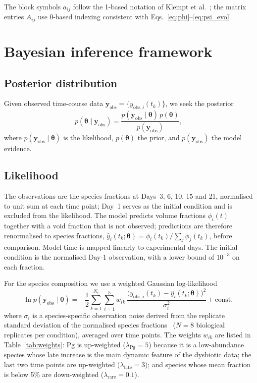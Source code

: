 \documentclass[11pt,a4paper]{article}
\newcommand{\btheta}{\boldsymbol{\theta}}
\newcommand{\yobs}{\mathbf{y}_{\mathrm{obs}}}
\begin{document}
The block symbols $a_{ij}$ follow the 1-based notation of Klempt et al.~\cite{Klempt2025ContinuumBiofilm}; the matrix entries $A_{ij}$ use 0-based indexing consistent with Eqs.~\eqref{eq:phi}--\eqref{eq:psi_evol}.

\section{Bayesian inference framework}
\label{sec:bayes}

\subsection{Posterior distribution}

Given observed time-course data $\yobs = \{y_{\mathrm{obs},i}(t_k)\}$, we seek the posterior
\begin{equation}
p(\btheta\mid\yobs)
= \frac{p(\yobs\mid\btheta)\,p(\btheta)}{p(\yobs)},
\label{eq:bayes}
\end{equation}
where $p(\yobs\mid\btheta)$ is the likelihood, $p(\btheta)$ the prior, and $p(\yobs)$ the model evidence.

\subsection{Likelihood}
\label{sec:likelihood}

The observations are the species fractions at Days~3, 6, 10, 15 and 21, normalised to unit sum at each time point; Day~1 serves as the initial condition and is excluded from the likelihood.
The model predicts volume fractions $\phi_i(t)$ together with a void fraction that is not observed; predictions are therefore renormalised to species fractions, $\hat{y}_i(t_k;\btheta)=\phi_i(t_k)\big/\sum_{j}\phi_j(t_k)$, before comparison.
Model time is mapped linearly to experimental days.
The initial condition is the normalised Day-1 observation, with a lower bound of $10^{-3}$ on each fraction.

For the species composition we use a weighted Gaussian log-likelihood
\begin{equation}
\ln p(\yobs\mid\btheta)
= -\frac12\sum_{k=1}^{N_t}\sum_{i=1}^{5} w_{ik}\,
\frac{\bigl(y_{\mathrm{obs},i}(t_k)-\hat{y}_i(t_k;\btheta)\bigr)^2}{\sigma_i^2} + \text{const},
\label{eq:likelihood}
\end{equation}
where $\sigma_{i}$ is a species-specific observation noise derived from the replicate standard deviation of the normalised species fractions~\cite{heine2025influence} ($N=8$ biological replicates per condition), averaged over time points.
The weights $w_{ik}$ are listed in Table~\ref{tab:weights}: Pg is up-weighted ($\lambda_{\mathrm{Pg}}=5$) because it is a low-abundance species whose late increase is the main dynamic feature of the dysbiotic data; the last two time points are up-weighted ($\lambda_{\mathrm{late}}=3$); and species whose mean fraction is below 5\% are down-weighted ($\lambda_{\mathrm{rare}}=0.1$).
\end{document}

